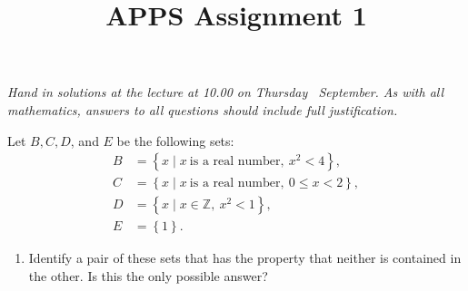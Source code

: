 \documentclass[a4paper,12pt]{amsart}
\author{}
\title{APPS Assignment 1}
\theoremstyle{definition} \newtheorem{lemma}{Lemma}
\theoremstyle{definition} \newtheorem{definition}[lemma]{Definition}
\theoremstyle{definition} \newtheorem{theorem}[lemma]{Theorem}
\theoremstyle{definition} \newtheorem{question}{Question}
\theoremstyle{definition} \newtheorem{example}[lemma]{Example}
\theoremstyle{remark} \newtheorem{remark}[lemma]{Remark}
\theoremstyle{definition} \newtheorem{corollary}[lemma]{Corollary}
\theoremstyle{definition} \newtheorem{proposition}[lemma]{Proposition}
\theoremstyle{remark} \newtheorem*{notation}{Notation}
\theoremstyle{remark} \newtheorem*{ackn}{Acknowledgements}
\begin{document}
\maketitle
\begin{center}
{\it
Hand in solutions at the lecture at 10.00 on Thursday~ September.  As with all mathematics, answers to all questions should include full justification.
}
\end{center}
\begin{description}[itemsep=1.0pt]
\item[Exercise~1.2 (edited)] Let $B, C, D$, and $E$ be the following sets:
\begin{align*}
B &=\left\{x \mid x\ \text{is a real number},\ x^2<4\right\},\\
C & =\left\{x \mid x\ \text{is a real number},\ 0\leq x<2\right\},\\
D & =\left\{x \mid x\in\mathbb{Z},\ x^2<1\right\},\\
E & =\left\{1\right\}.
\end{align*}
\begin{enumerate}[label=(\alph*)]
\item Identify a pair of these sets that has the property that neither is
contained in the other.  Is this the only possible answer?


\end{enumerate}
\end{description}
\end{document}
